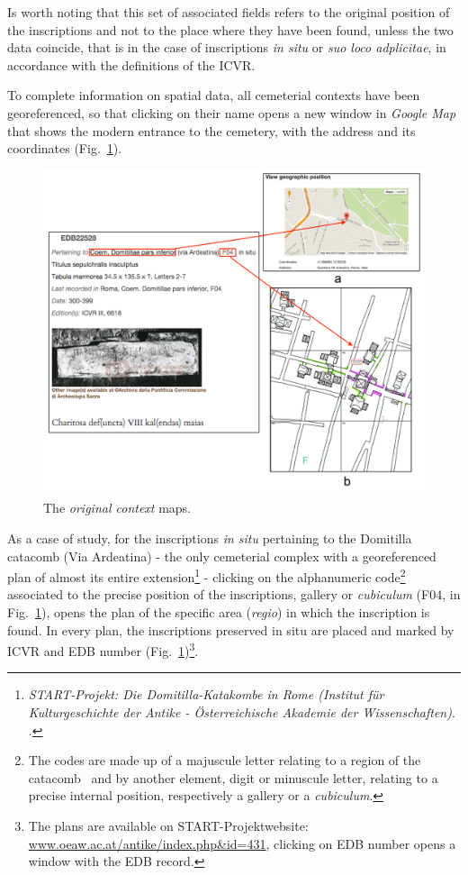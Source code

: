 \documentclass[amsthm,ebook]{saparticle}
\begin{document}
Is worth noting that this set of associated fields refers to the original position of the inscriptions and not to the
place where they have been found, unless the two data coincide, that is in the case of inscriptions \emph{in situ} or \emph{suo loco
adplicitae}, in accordance with the definitions of the ICVR.

To complete information on spatial data, all cemeterial contexts have been georeferenced, so that clicking on their name
opens a new window in \emph{Google Map} that shows the modern entrance to the cemetery, with the address and its coordinates
(Fig.~\ref{fig:6}). 

 \begin{figure}[hbp]
\centering
 \includegraphics[width=\columnwidth]{EAGLE2016Roccoengrev-img006.png} 
\caption{The \emph{original context} maps.}
\label{fig:6}
\end{figure}


As a case of study, for the inscriptions \emph{in situ} pertaining to the Domitilla catacomb (Via Ardeatina) - the only
cemeterial complex with a georeferenced plan of almost its entire extension\footnote{\emph{START-Projekt: Die
Domitilla-Katakombe in Rome (Institut für Kulturgeschichte der Antike - Österreichische Akademie der Wissenschaften)}.
\citet{orlandi_case_2014}.} - clicking on the alphanumeric code\footnote{ The codes are made up of a majuscule letter
relating to a region of the catacomb \ and by another element, digit or minuscule letter, relating to a precise
internal position, respectively a gallery or a \emph{cubiculum}. } associated to the precise position of the inscriptions,
gallery or \emph{cubiculum} (F04, in Fig.~\ref{fig:6}), opens the plan of the specific area (\emph{regio}) in which the inscription is found.
In every plan, the inscriptions preserved in situ are placed and marked by ICVR and EDB number (Fig.~\ref{fig:6})\footnote{The
plans are available on START-Projektwebsite: \url{www.oeaw.ac.at/antike/index.php\&id=431}, clicking on EDB number opens a
window with the EDB record. }.
\end{document}
